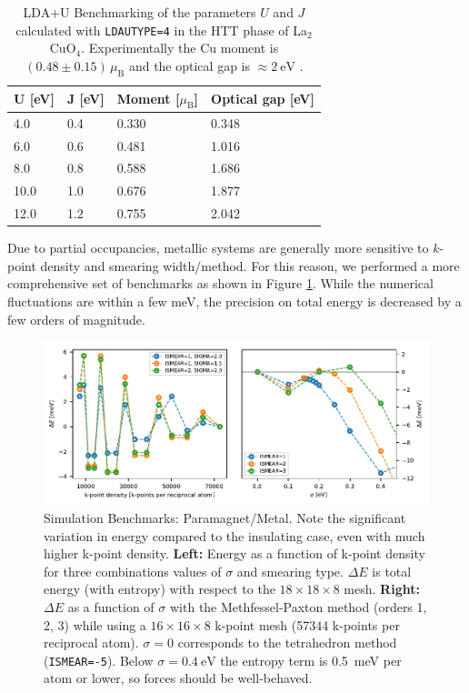 \begin{table}[b]
	\centering
	\caption[LDA+U Benchmarking]{LDA+U Benchmarking of the parameters $U$ and $J$ calculated with \texttt{LDAUTYPE=4} in the HTT phase of La$_2$CuO$_4$. Experimentally the Cu moment is $(0.48 \pm 0.15) \, \mu_\text{B}$ \cite{Vaknin1987} and the optical gap is $\approx \SI{2}{\eV}$ \cite{Uchida1991}.}
	\label{tab:ldau}
	\begin{tabular}{@{}llll@{}}
		\toprule
		U [eV] & J [eV] & Moment [$\mu_\text{B}$] & Optical gap [eV] \\ \midrule
		4.0    & 0.4    & 0.330       & 0.348    \\
		6.0    & 0.6    & 0.481       & 1.016    \\
		8.0    & 0.8    & 0.588       & 1.686    \\
		10.0   & 1.0    & 0.676       & 1.877    \\
		12.0   & 1.2    & 0.755       & 2.042    \\ \bottomrule
	\end{tabular}
\end{table}

Due to partial occupancies, metallic systems are generally more sensitive to $k$-point density and smearing width/method. For this reason, we performed a more comprehensive set of benchmarks as shown in Figure \ref{fig:sim_bench_para}. While the numerical fluctuations are within a few meV, the precision on total energy is decreased by a few orders of magnitude.

\begin{figure}
    \centering
    \includegraphics[width=\textwidth]{fig/simulation/convergence_metal.pdf}
    \caption[Simulation Benchmarks: Paramagnet/Metal]{Simulation Benchmarks: Paramagnet/Metal. Note the significant variation in energy compared to the insulating case, even with much higher k-point density. \textbf{Left:} Energy as a function of k-point density for three combinations values of $\sigma$ and smearing type. $\Delta E$ is total energy (with entropy) with respect to the $18 \times 18 \times 8$ mesh. \textbf{Right:} $\Delta E$ as a function of $\sigma$ with the Methfessel-Paxton method (orders 1, 2, 3) while using a $16 \times 16 \times 8$ k-point mesh (57344 k-points per reciprocal atom). $\sigma=0$ corresponds to the tetrahedron method (\texttt{ISMEAR=-5}). Below $\sigma = \SI{0.4}{\eV}$ the entropy term is \SI{0.5}{\milli\eV} per atom or lower, so forces should be well-behaved.}
    \label{fig:sim_bench_para}
\end{figure}

